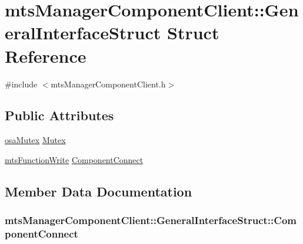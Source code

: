 \hypertarget{structmts_manager_component_client_1_1_general_interface_struct}{}\section{mts\+Manager\+Component\+Client\+:\+:General\+Interface\+Struct Struct Reference}
\label{structmts_manager_component_client_1_1_general_interface_struct}


{\ttfamily \#include $<$mts\+Manager\+Component\+Client.\+h$>$}

\subsection*{Public Attributes}
\begin{DoxyCompactItemize}
\item 
\hyperlink{classosa_mutex}{osa\+Mutex} \hyperlink{structmts_manager_component_client_1_1_general_interface_struct_a4a55011d39513a9c87772939b0a23aad}{Mutex}
\item 
\hyperlink{classmts_function_write}{mts\+Function\+Write} \hyperlink{structmts_manager_component_client_1_1_general_interface_struct_ac3601e8c80ad2c325e9de360c7d12c7d}{Component\+Connect}
\end{DoxyCompactItemize}


\subsection{Member Data Documentation}
\hypertarget{structmts_manager_component_client_1_1_general_interface_struct_ac3601e8c80ad2c325e9de360c7d12c7d}{}
\subsubsection[{Component\+Connect}]{ mts\+Manager\+Component\+Client\+::\+General\+Interface\+Struct\+::\+Component\+Connect}\label{structmts_manager_component_client_1_1_general_interface_struct_ac3601e8c80ad2c325e9de360c7d12c7d}
\hypertarget{structmts_manager_component_client_1_1_general_interface_struct_a4a55011d39513a9c87772939b0a23aad}{}
